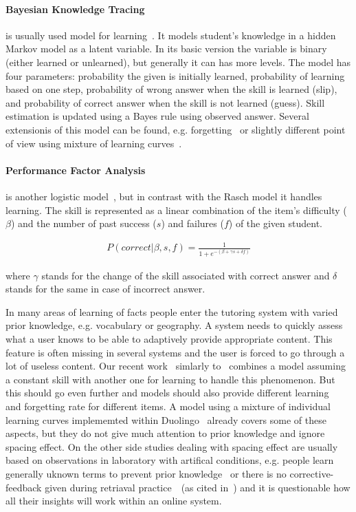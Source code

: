 \documentclass[table,color]{fithesis3/fithesis3}
\begin{document}
\paragraph{Bayesian Knowledge Tracing} is usually used model for
learning~\cite{van2013properties}. It models student's knowledge in a hidden
Markov model as a latent variable. In its basic version the variable is binary
(either learned or unlearned), but generally it can has more levels. The model
has four parameters: probability the given is initially learned, probability of
learning based on one step, probability of wrong answer when the skill is
learned (slip), and probability of correct answer when the skill is not learned
(guess). Skill estimation is updated using a Bayes rule using observed answer.
Several extensionis of this model can be found, e.g.
forgetting~\cite{qiu2010does} or slightly different point of view using mixture
of learning curves~\cite{streeter2015mixture}.

\paragraph{Performance Factor Analysis} is another logistic
model~\cite{pavlik2009performance}, but in contrast with the Rasch model it
handles learning. The skill is represented as a linear combination of the
item's difficulty ($\beta$) and the number of past success ($s$) and failures
($f$) of the given student.

\begin{align}
P(correct|\beta,s, f) = \frac{1}{1 + e^{-(\beta + \gamma s + \delta f)}}
\end{align}

where $\gamma$ stands for the change of the skill associated with correct
answer and $\delta$ stands for the same in case of incorrect answer.

\bigskip

\noindent
In many areas of learning of facts people enter the tutoring system with varied
prior knowledge, e.g. vocabulary or geography. A system needs to quickly assess
what a user knows to be able to adaptively provide appropriate content. This
feature is often missing in several systems and the user is forced to go through
a lot of useless content. Our recent work~\cite{papousek2014adaptive} simlarly
to~\cite{khajah2014integrating} combines a model assuming a constant skill with
another one for learning to handle this phenomenon.  But this should go even
further and models should also provide different
learning~\cite{pelanek2015modeling} and forgetting rate for different items.
A model using a mixture of individual learning curves implememted within
Duolingo~\cite{streeter2015mixture} already covers some of these aspects, but
they do not give much attention to prior knowledge and ignore spacing effect.
On the other side studies dealing with spacing effect are usually based on
observations in laboratory with artifical conditions, e.g.  people learn
generally uknown terms to prevent prior knowledge~\cite{kang2014retrieval} or
there is no corrective-feedback given during retriaval
practice~\cite{landauer1978optimum}~(as cited in~\cite{kang2014retrieval}) and
it is questionable how all their insights will work within an online system.
\end{document}
